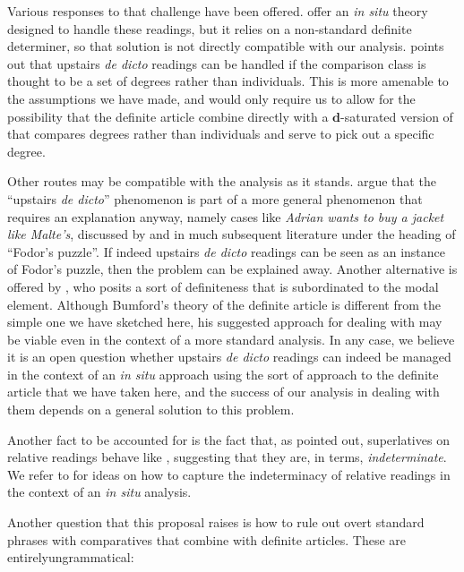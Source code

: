 \documentclass[output=paper
,modfonts
,nonflat]{langsci/langscibook}
\begin{document}
Various responses to that challenge have been offered. \citet{SharvitStateva2002} offer an \textit{in situ} theory designed to handle these readings, but it relies on a non-standard definite determiner, so that solution is not directly compatible with our analysis.  \citet{Solomon2011} points out that upstairs \textit{de dicto} readings can be handled if the comparison class is thought to be a set of degrees rather than individuals. This is more amenable to the assumptions we have made, and would only require us to allow for the possibility that the definite article combine directly with a $\textbf{d}$-saturated version of \cmpr{} that compares degrees rather than individuals and serve to pick out a specific degree.

Other routes may be compatible with the analysis as it stands. \citet{CoppockBeaver2014} argue that the ``upstairs \textit{de dicto}'' phenomenon is part of a more general phenomenon that requires an explanation anyway, namely cases like \textit{Adrian wants to buy a jacket like Malte's}, discussed by \citet{Fodor1970} and in much subsequent literature under the heading of ``Fodor's puzzle''. If indeed upstairs \textit{de dicto} readings can be seen as an instance of Fodor's puzzle, then the problem can be explained away. Another alternative is offered by \citet{Bumford2016}, who posits a sort of definiteness that is subordinated to the modal element. Although Bumford's theory of the definite article is different from the simple one we have sketched here, his suggested approach for dealing with  may be viable even in the context of a more standard analysis. In any case, we believe it is an open question whether upstairs \textit{de dicto} readings can indeed be managed in the context of an \textit{in situ} approach using the sort of approach to the definite article that we have taken here, and the success of our analysis in dealing with them depends on a general solution to this problem.

Another fact to be accounted for is the fact that, as \citet{Szabolcsi1986} pointed out, superlatives on relative readings behave like , suggesting that they are, in  terms, \textit{indeterminate}. We refer to \citet{CoppockBeaver2014} for ideas on how to capture the indeterminacy of relative readings in the context of an \textit{in situ} analysis.

Another question that this proposal raises is how to rule out overt standard phrases with comparatives that combine with definite articles. These are entirely\largerpage ungrammatical:
\end{document}
